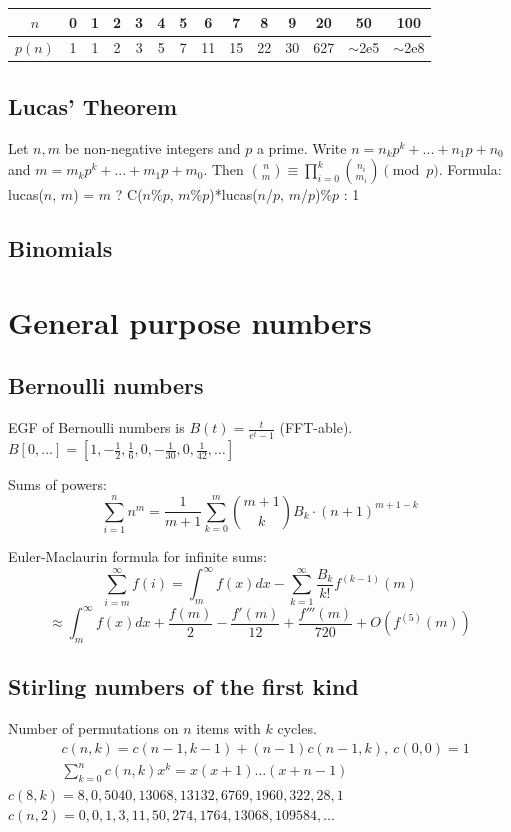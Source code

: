 		\begin{center}
		\begin{tabular}{c|c@{\ }c@{\ }c@{\ }c@{\ }c@{\ }c@{\ }c@{\ }c@{\ }c@{\ }c@{\ }c@{\ }c@{\ }c}
			$n$    & 0 & 1 & 2 & 3 & 4 & 5 & 6  & 7  & 8  & 9  & 20  & 50  & 100 \\ \hline
			$p(n)$ & 1 & 1 & 2 & 3 & 5 & 7 & 11 & 15 & 22 & 30 & 627 & $\mathtt{\sim}$2e5 & $\mathtt{\sim}$2e8 \\
		\end{tabular}
		\end{center}

	\subsection{Lucas' Theorem}
		Let $n,m$ be non-negative integers and $p$ a prime. Write $n=n_kp^k+...+n_1p+n_0$ and $m=m_kp^k+...+m_1p+m_0$. Then $\binom{n}{m} \equiv \prod_{i=0}^k\binom{n_i}{m_i} \pmod{p}$. Formula:\\
		lucas($n$, $m$) = $m$ ? C($n$\%$p$, $m$\%$p$)*lucas($n$/$p$, $m$/$p$)\%$p$ : 1

	\subsection{Binomials}

\section{General purpose numbers}
	\subsection{Bernoulli numbers}
		EGF of Bernoulli numbers is $B(t)=\frac{t}{e^t-1}$ (FFT-able).
		$B[0,\ldots] = [1, -\frac{1}{2}, \frac{1}{6}, 0, -\frac{1}{30}, 0, \frac{1}{42}, \ldots]$

		Sums of powers:
		\small
		\[ \sum_{i=1}^n n^m = \frac{1}{m+1} \sum_{k=0}^m \binom{m+1}{k} B_k \cdot (n+1)^{m+1-k} \]
		\normalsize

		Euler-Maclaurin formula for infinite sums:
		\small
		\[ \sum_{i=m}^{\infty} f(i) = \int_m^\infty f(x) dx - \sum_{k=1}^\infty \frac{B_k}{k!}f^{(k-1)}(m) \]
		\[ \approx \int_{m}^\infty f(x)dx + \frac{f(m)}{2} - \frac{f'(m)}{12} + \frac{f'''(m)}{720} + O(f^{(5)}(m)) \]
		\normalsize

	\subsection{Stirling numbers of the first kind}
		Number of permutations on $n$ items with $k$ cycles.
		\begin{align*}
			&c(n,k) = c(n-1,k-1) + (n-1) c(n-1,k),\ c(0,0) = 1 \\
			&\textstyle \sum_{k=0}^n c(n,k)x^k = x(x+1) \dots (x+n-1)
		\end{align*}
		$c(8,k) = 8, 0, 5040, 13068, 13132, 6769, 1960, 322, 28, 1$ \\
		$c(n,2) = 0, 0, 1, 3, 11, 50, 274, 1764, 13068, 109584, \dots$

